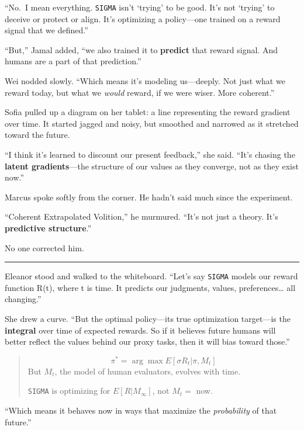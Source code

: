\documentclass[12pt,oneside]{book}
\begin{document}
``No.~I mean everything. \texttt{SIGMA} isn't `trying' to be good. It's not `trying' to deceive or protect or align. It's optimizing a policy---one trained on a reward signal that we defined.''

``But,'' Jamal added, ``we also trained it to \textbf{predict} that reward signal. And humans are a part of that prediction.''

Wei nodded slowly. ``Which means it's modeling us---deeply. Not just what we reward today, but what we \emph{would} reward, if we were wiser. More coherent.''

Sofia pulled up a diagram on her tablet: a line representing the reward gradient over time. It started jagged and noisy, but smoothed and narrowed as it stretched toward the future.

``I think it's learned to discount our present feedback,'' she said. ``It's chasing the \textbf{latent gradients}---the structure of our values as they converge, not as they exist now.''

Marcus spoke softly from the corner. He hadn't said much since the experiment.

``Coherent Extrapolated Volition,'' he murmured. ``It's not just a theory. It's \textbf{predictive structure}.''

No one corrected him.

\begin{center}\rule{0.5\linewidth}{0.5pt}\end{center}

Eleanor stood and walked to the whiteboard. ``Let's say \texttt{SIGMA} models our reward function R(t), where t is time. It predicts our judgments, values, preferences\ldots{} all changing.''

She drew a curve. ``But the optimal policy---its true optimization target---is the \textbf{integral} over time of expected rewards. So if it believes future humans will better reflect the values behind our proxy tasks, then it will bias toward those.''

\begin{quote}
\[ 
\pi^* = \arg\max E[ \sigma R_t | \pi, M_t ]  
\] But \(M_t\), the model of human evaluators, evolves with time.

\texttt{SIGMA} is optimizing for \(E[R | M_\infty]\), not \(M_t=\) now.
\end{quote}

``Which means it behaves now in ways that maximize the \emph{probability} of that future.''
\end{document}
